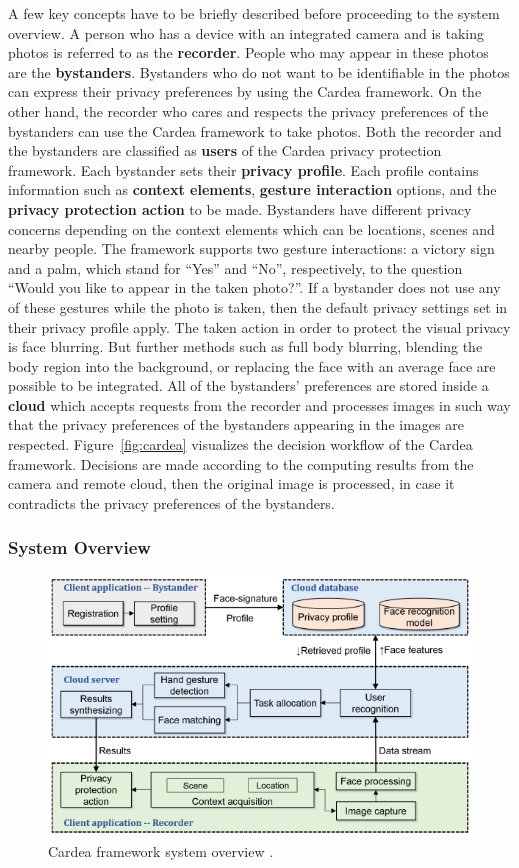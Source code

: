 \documentclass[conference, 11pt]{IEEEtran}
\begin{document}
A few key concepts have to be briefly described before proceeding to the system overview. A person who has a device with an integrated camera and is taking photos is referred to as the \textbf{recorder}. People who may appear in these photos are the \textbf{bystanders}. Bystanders who do not want to be identifiable in the photos can express their privacy preferences by using the Cardea framework. On the other hand, the recorder who cares and respects the privacy preferences of the bystanders can use the Cardea framework to take photos. Both the recorder and the bystanders are classified as \textbf{users} of the Cardea privacy protection framework. Each bystander sets their \textbf{privacy profile}. Each profile contains information such as \textbf{context elements}, \textbf{gesture interaction} options, and the \textbf{privacy protection action} to be made. Bystanders have different privacy concerns depending on the context elements which can be locations, scenes and nearby people. The framework supports two gesture interactions: a victory sign and a palm, which stand for “Yes” and “No”, respectively, to the question “Would you like to appear in the taken photo?”. If a bystander does not use any of these gestures while the photo is taken, then the default privacy settings set in their privacy profile apply. The taken action in order to protect the visual privacy is face blurring. But further methods such as full body blurring, blending the body region into the background, or replacing the face with an average face are possible to be integrated. All of the bystanders' preferences are stored inside a \textbf{cloud} which accepts requests from the recorder and processes images in such way that the privacy preferences of the bystanders appearing in the images are respected. Figure~\ref{fig:cardea} visualizes the decision workflow of the Cardea framework. Decisions are made according to the computing results from the camera and remote cloud, then the original image is processed, in case it contradicts the privacy preferences of the bystanders. 

\subsubsection{System Overview}
\begin{figure}[t]
\centerline{\includegraphics[width=.5\textwidth]{img/cardea_overview_diagram.png}}
\caption{Cardea framework system overview \cite{shu2016cardea}.}
\label{fig:cardea2}
\end{figure}
\end{document}
